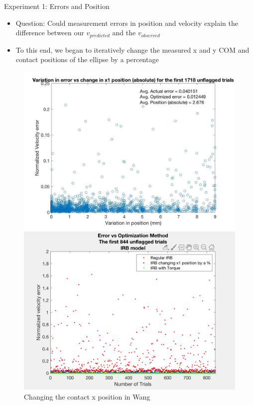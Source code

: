 \begin{frame}{Experiment 1: Errors and Position}
    \begin{itemize}
        \item Question: Could measurement errors in position and velocity explain the difference between our $v_{predicted}$ and the $v_{observed}$
        \item To this end, we began to iteratively change the measured x and y COM and contact positions of the ellipse by a percentage
    \end{itemize} 

    \begin{figure}[!htb]
      \includegraphics[width=\linewidth]{figures/changeInXPos.jpg}
      \caption{Changing the contact x position in Wang}
      \label{fig:awesome_image1}
    \endminipage\hfill
      \includegraphics[width=\linewidth]{figures/errorVsOptMethod.png}

\end{figure}
\end{frame}
